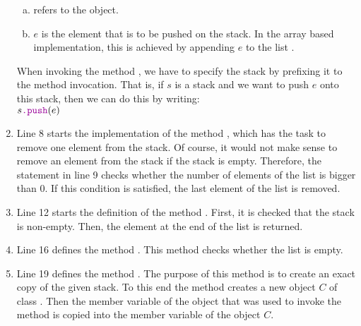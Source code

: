 \begin{enumerate}
      \begin{enumerate}[(a)]
      \item {} refers to the  object.
      \item $e$ is the element that is to be pushed on the stack.  In the array based
            implementation, this is achieved by appending $e$ to the list .
      \end{enumerate} 
      When invoking the method , we have to specify the stack by prefixing it to the method
      invocation.  That is, if $s$ is a stack and we want to push $e$ onto this stack, then we can do this by
      writing: 
      \\[0.2cm]
      \hspace*{1.3cm}
      $s\mytt{.push}(e)$
\item Line 8 starts the implementation of the method , which has the task to remove 
      one element from the stack.  Of course, it would not make sense to remove an element from the
      stack if the stack is empty.  Therefore, the  statement in line 9 checks
      whether the number of elements of the list  is bigger than $0$.
      If this condition is satisfied, the last element of the list  is removed.
\item Line 12 starts the definition of the method .  First, it is checked that the stack
      is non-empty.  Then, the element at the end of the list  is returned.
\item Line 16 defines the method .  This method checks whether the list
       is empty.
\item Line 19 defines the method .  The purpose of this method is to create an exact
      copy of the given stack.  To this end the method creates a new object $C$ of class .
      Then the member variable  of the object  that was used to invoke
      the method  is copied into the member variable  of the object $C$.


\end{enumerate}
